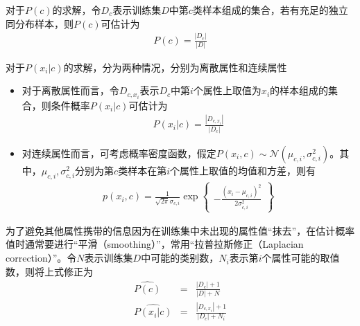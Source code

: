 对于$P(c)$的求解，令$D_c$表示训练集$D$中第$c$类样本组成的集合，若有充足的独立同分布样本，则$P(c)$可估计为
\begin{eqnarray}
P(c)=\frac{|D_c|}{|D|}
\end{eqnarray}

对于$P(x_i|c)$的求解，分为两种情况，分别为离散属性和连续属性
\begin{itemize}
\item 对于离散属性而言，令$D_{c,x_i}$表示$D_c$中第$i$个属性上取值为$x_i$的样本组成的集合，则条件概率$P(x_i|c)$可估计为
\begin{eqnarray}
P(x_i|c)=\frac{|D_{c,x_i}|}{|D_c|}
\end{eqnarray}
\item 对连续属性而言，可考虑概率密度函数，假定$P(x_i,c)\sim\mathcal{N}(\mu_{c,i},\sigma_{c,i}^2)$。其中，$\mu_{c,i},\sigma_{c,i}^2$分别为第$c$类样本在第$i$个属性上取值的均值和方差，则有
\begin{eqnarray}
p(x_i,c)=\frac{1}{\sqrt{2\pi}\sigma_{c,i}}\exp
\left\lbrace
\begin{aligned}
-\frac{(x_i-\mu_{c,i})^2}{2\sigma_{c,i}^2}
\end{aligned}
\right\rbrace
\end{eqnarray}
\end{itemize}
为了避免其他属性携带的信息因为在训练集中未出现的属性值“抹去”，在估计概率值时通常要进行“平滑（smoothing）”，常用“拉普拉斯修正（Laplacian correction）”。令$N$表示训练集$D$中可能的类别数，$N_i$表示第$i$个属性可能的取值数，则将上式修正为
\begin{eqnarray}
\hat{P(c)}&=&\frac{|D_c|+1}{|D|+N}\\
\hat{P(x_i|c)}&=&\frac{|D_{c,x_i}|+1}{|D_c|+N_i}
\end{eqnarray}


